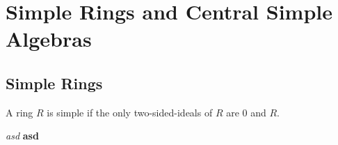 \chapter{Simple Rings and Central Simple Algebras}\label{chap:simple-ring-csa}

\section{Simple Rings}\label{sec:simple-ring}

\begin{definition} A ring $R$ is simple if the only two-sided-ideals of $R$ are ${0}$ and $R$.
  \leanok
\end{definition}

{\em asd} {\bf asd}
